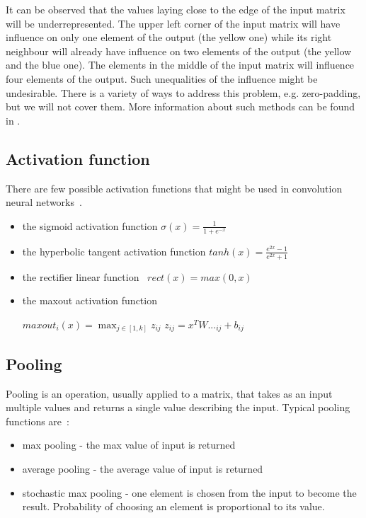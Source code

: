 \documentclass[a4paper,10pt]{report}
\begin{document}
	  It can be observed that the values laying close to the edge of the input matrix will be underrepresented. The upper left corner of the input matrix will have influence on only one element of the output (the yellow one) while its right neighbour will already have influence on two elements of the output (the yellow and the blue one). The elements in the middle of the input matrix will influence four elements of the output. Such unequalities of the influence might be undesirable. There is a variety of ways to address this problem, e.g. zero-padding, but we will not cover them. More information about such methods can be found in \cite{Bengio}. 
	  
	\subsection{Activation function}\label{sec:ACTIVATION_FUNCTIONS}
	  There are few possible activation functions that might be used in convolution neural networks~\cite{DUTCH}.
	  \begin{itemize}
	   \item the sigmoid activation function $\sigma(x) = \frac{1}{1 + e^{-x}}$
	   \item the hyperbolic tangent activation function $tanh(x) = \frac{e^{2x} - 1}{e^{2x} + 1}$
	   \item the rectifier linear function~\cite{GLOROT_BENGIO} $rect(x) = max(0,x)$
	   \item the maxout activation function
	    \begin{center}
	      $maxout_i(x) = \max_{j \in [1, k]}z_{ij}$ 
	      $z_{ij}=x^TW..._{ij} + b_{ij} $ %
	    \end{center}
	  \end{itemize}

	
	\subsection{Pooling}
	  Pooling is an operation, usually applied to a matrix, that takes as an input multiple values and returns a single value describing the input. Typical pooling functions are~\cite{DUTCH}:
	  \begin{itemize}
	    \item max pooling - the max value of input is returned
	    \item average pooling - the average value of input is returned
	    \item stochastic max pooling - one element is chosen from the input to become the result. Probability of choosing an element is proportional to its value.~\cite{ZEILER} 
	  \end{itemize}
	  
\end{document}

